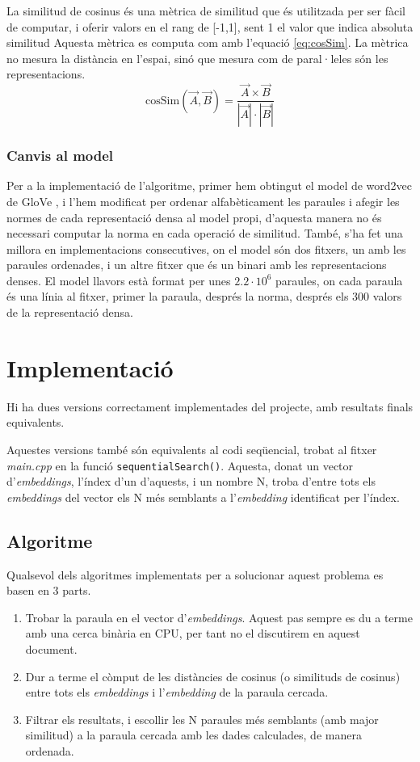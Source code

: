 \documentclass[catalan,10pt,a4paper]{article}
\begin{document}
La similitud de cosinus \cite{Cosinesi72:online} és una mètrica de similitud que és utilitzada per ser fàcil de computar, i oferir valors en el rang de [-1,1], sent 1 el valor que indica absoluta similitud Aquesta mètrica es computa com amb l'equació \ref{eq:cosSim}. La mètrica no mesura la distància en l'espai, sinó que mesura com de paral·leles són les representacions.
\begin{equation} \label{eq:cosSim}
	\text{cosSim}(\vec A,\vec B) = \frac{\vec A\times \vec B}{|\vec A|\cdot|\vec B|}
\end{equation}

\subsubsection*{Canvis al model}
Per a la implementació de l'algoritme, primer hem obtingut el model de word2vec de GloVe \cite{GloVeGlo18:online}, i l'hem modificat per ordenar alfabèticament les paraules i afegir les normes de cada representació densa al model propi, d'aquesta manera no és necessari computar la norma en cada operació de similitud. També, s'ha fet una millora en implementacions consecutives, on el model són dos fitxers, un amb les paraules ordenades, i un altre fitxer que és un binari amb les representacions denses. El model llavors està format per unes $2.2\cdot 10^{6}$ paraules, on cada paraula és una línia al fitxer, primer la paraula, després la norma, després els 300 valors de la representació densa.	

\section*{Implementació}
Hi ha dues versions correctament implementades del projecte, amb resultats finals equivalents.

Aquestes versions també són equivalents al codi seqüencial, trobat al fitxer \textit{main.cpp} en la funció \verb|sequentialSearch()|. Aquesta, donat un vector d'\textit{embeddings}, l'índex d'un d'aquests, i un nombre N, troba d'entre tots els \textit{embeddings} del vector els N més semblants a l'\textit{embedding} identificat per l'índex.

\subsection*{Algoritme}
Qualsevol dels algoritmes implementats per a solucionar aquest problema es basen en 3 parts.
\begin{enumerate}
	\item Trobar la paraula en el vector d'\textit{embeddings}. Aquest pas sempre es du a terme amb una cerca binària en CPU, per tant no el discutirem en aquest document.
	\item Dur a terme el còmput de les distàncies de cosinus (o similituds de cosinus) entre tots els \textit{embeddings} i l'\textit{embedding} de la paraula cercada.
	\item Filtrar els resultats, i escollir les N paraules més semblants (amb major similitud) a la paraula cercada amb les dades calculades, de manera ordenada.
\end{enumerate}
\end{document}
